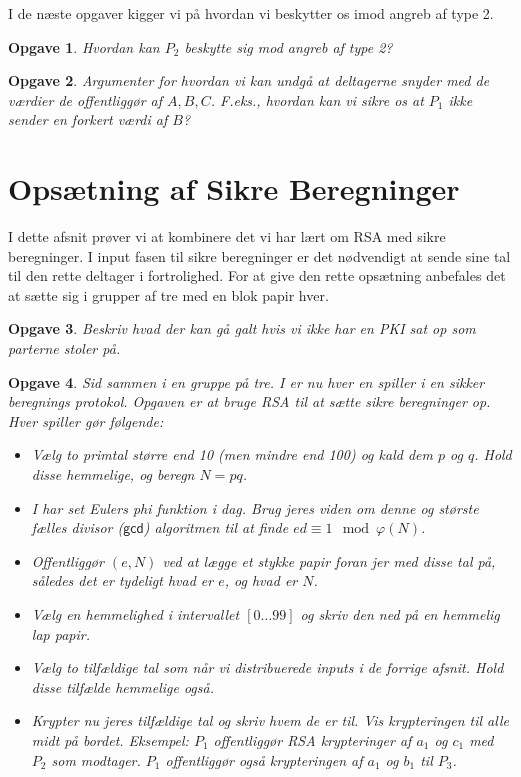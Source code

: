 \documentclass{article}
\theoremstyle{opgavedd}
\newtheorem{opgave}{Opgave}[section]
\begin{document}
I de næste opgaver kigger vi på hvordan vi beskytter os imod angreb af type 2.

\begin{opgave}
  Hvordan kan $P_{2}$ beskytte sig mod angreb af type 2?
\end{opgave}

\begin{opgave}
  Argumenter for hvordan vi kan undgå at deltagerne snyder med de værdier de offentliggør
  af $A,B,C$. F.eks., hvordan kan vi sikre os at $P_{1}$ ikke sender en forkert værdi af $B$?
\end{opgave}

\newpage

\section{Opsætning af Sikre Beregninger}

I dette afsnit prøver vi at kombinere det vi har lært om RSA med sikre beregninger. I
input fasen til sikre beregninger er det nødvendigt at sende sine tal til den rette
deltager i fortrolighed. For at give den rette opsætning anbefales det at sætte sig i
grupper af tre med en blok papir hver.

\begin{opgave}
  Beskriv hvad der kan gå galt hvis vi ikke har en PKI sat op som parterne stoler på.
\end{opgave}

\begin{opgave}
  Sid sammen i en gruppe på tre. I er nu hver en spiller i en sikker beregnings
  protokol. Opgaven er at bruge RSA til at sætte sikre beregninger op. Hver spiller gør
  følgende:
  \begin{itemize}
  \item Vælg to primtal større end 10 (men mindre end 100) og kald dem $p$ og $q$. Hold
    disse hemmelige, og beregn $N=pq$.
  \item I har set Eulers phi funktion i dag. Brug jeres viden om denne og største fælles
    divisor ($\mathsf{gcd}$) algoritmen til at finde $ed\equiv1\mod\varphi(N)$.
  \item Offentliggør $(e,N)$ ved at lægge et stykke papir foran jer med disse tal på,
    således det er tydeligt hvad er $e$, og hvad er $N$.
  \item Vælg en hemmelighed i intervallet $[0\dots 99]$ og skriv den ned på en hemmelig
    lap papir.
  \item Vælg to tilfældige tal som når vi distribuerede inputs i de forrige afsnit. Hold
    disse tilfælde hemmelige også.
  \item Krypter nu jeres tilfældige tal og skriv hvem de er til. Vis krypteringen til alle
    midt på bordet. Eksempel: $P_{1}$ offentliggør RSA krypteringer af $a_{1}$ og $c_{1}$
    med $P_{2}$ som modtager. $P_{1}$ offentliggør også krypteringen af $a_{1}$ og $b_{1}$
    til $P_{3}$.
  \end{itemize}
\end{opgave}
\end{document}
